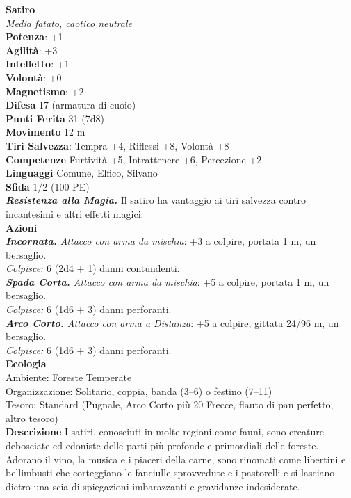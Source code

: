 \begin{multicols}{2}
\medskip\textbf{Satiro}\\
\emph{Media fatato, caotico neutrale}\\
\textbf{Potenza}: +1\\
\textbf{Agilità}: +3\\
\textbf{Intelletto}: +1\\
\textbf{Volontà}: +0\\
\textbf{Magnetismo}: +2\\
\textbf{Difesa} 17 (armatura di cuoio)\\
\textbf{Punti Ferita} 31 (7d8)\\
\textbf{Movimento} 12 m\\
\textbf{Tiri Salvezza}: Tempra +4, Riflessi +8, Volontà +8\\
\textbf{Competenze} Furtività +5, Intrattenere +6, Percezione +2\\
\textbf{Linguaggi} Comune, Elfico, Silvano\\
\textbf{Sfida} 1/2 (100 PE)\smallskip\\
\emph{\textbf{Resistenza alla Magia.}} Il satiro ha vantaggio ai tiri salvezza contro incantesimi e altri effetti magici.\\
\smallskip\textbf{Azioni}\\
\emph{\textbf{Incornata.} Attacco con arma da mischia}: +3 a colpire, portata 1 m, un bersaglio.\\
\emph{Colpisce:} 6 (2d4 + 1) danni contundenti.\\
\emph{\textbf{Spada Corta.} Attacco con arma da mischia}: +5 a colpire, portata 1 m, un bersaglio.\\
\emph{Colpisce:} 6 (1d6 + 3) danni perforanti.\\
\emph{\textbf{Arco Corto.} Attacco con arma a Distanza}: +5 a colpire, gittata 24/96 m, un bersaglio.\\
\emph{Colpisce:} 6 (1d6 + 3) danni perforanti.\\
\textbf{Ecologia}\\
Ambiente: Foreste Temperate\\
Organizzazione: Solitario, coppia, banda (3–6) o festino (7–11)\\
Tesoro: Standard (Pugnale, Arco Corto più 20 Frecce, flauto di pan perfetto, altro tesoro)\\
\textbf{Descrizione}
I satiri, conosciuti in molte regioni come fauni, sono creature debosciate ed edoniste delle parti più profonde e primordiali delle foreste. Adorano il vino, la musica e i piaceri della carne, sono rinomati come libertini e bellimbusti che corteggiano le fanciulle sprovvedute e i pastorelli e si lasciano dietro una scia di spiegazioni imbarazzanti e gravidanze indesiderate.\\


\end{multicols}
